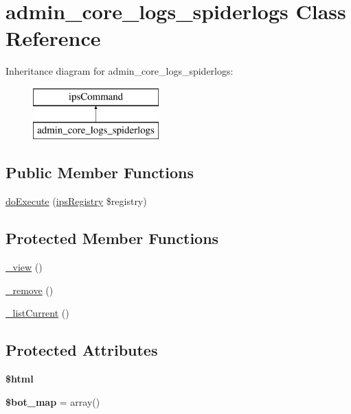 \hypertarget{classadmin__core__logs__spiderlogs}{\section{admin\-\_\-core\-\_\-logs\-\_\-spiderlogs Class Reference}
\label{classadmin__core__logs__spiderlogs}
}
Inheritance diagram for admin\-\_\-core\-\_\-logs\-\_\-spiderlogs\-:\begin{figure}[H]
\begin{center}
\leavevmode
\includegraphics[height=2.000000cm]{classadmin__core__logs__spiderlogs}
\end{center}
\end{figure}
\subsection*{Public Member Functions}
\begin{DoxyCompactItemize}
\item 
\hyperlink{classadmin__core__logs__spiderlogs_afbc4e912a0604b94d47d66744c64d8ba}{do\-Execute} (\hyperlink{classips_registry}{ips\-Registry} \$registry)
\end{DoxyCompactItemize}
\subsection*{Protected Member Functions}
\begin{DoxyCompactItemize}
\item 
\hyperlink{classadmin__core__logs__spiderlogs_aecb3513e402840411fb3737f4f2d3193}{\-\_\-view} ()
\item 
\hyperlink{classadmin__core__logs__spiderlogs_a6e3a0c448dcfd8610c6ddf42c6c660aa}{\-\_\-remove} ()
\item 
\hyperlink{classadmin__core__logs__spiderlogs_abc03e9ca0857dea04554a012ac374f5a}{\-\_\-list\-Current} ()
\end{DoxyCompactItemize}
\subsection*{Protected Attributes}
\begin{DoxyCompactItemize}
\item 
\hypertarget{classadmin__core__logs__spiderlogs_a6f96e7fc92441776c9d1cd3386663b40}{{\bfseries \$html}}\label{classadmin__core__logs__spiderlogs_a6f96e7fc92441776c9d1cd3386663b40}

\item 
\hypertarget{classadmin__core__logs__spiderlogs_ae0cc74fd9525832ac0f6379d7695d6dd}{{\bfseries \$bot\-\_\-map} = array()}\label{classadmin__core__logs__spiderlogs_ae0cc74fd9525832ac0f6379d7695d6dd}

\end{DoxyCompactItemize}
